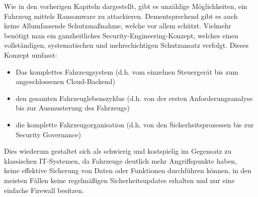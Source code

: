 Wie in den vorherigen Kapiteln dargestellt, gibt es unzählige Möglichkeiten, ein 
Fahrzeug mittels Ransomware zu attackieren. Dementsprechend gibt es auch keine 
Allumfassende Schutzmaßnahme, welche vor allem schützt. Vielmehr benötigt man ein 
ganzheitliches Security-Engineering-Konzept, welches einen vollständigen, systematischen 
und mehrschichtigen Schutzansatz verfolgt. 
Dieses Konzept umfasst:

\begin{itemize}
    \item Das komplettes Fahrzeugsystem (d.h. vom einzelnen Steuergerät bis 
    zum angeschlossenen Cloud-Backend)
    \item den gesamten Fahrzeuglebenszyklus (d.h. von der ersten Anforderungsanalyse 
    bis zur Ausmusterung des Fahrzeugs)
    \item die komplette Fahrzeugorganisation (d.h. von den Sicherheitsprozessen 
    bis zur Security Governance)
\end{itemize}

Dies wiederum gestaltet sich als schwierig und kostspielig im Gegensatz zu 
klassischen IT-Systemen, da Fahrzeuge deutlich mehr Angriffspunkte haben, 
keine effektive Sicherung von Daten oder Funktionen durchführen können, in den 
meisten Fällen keine regelmäßigen Sicherheitsupdates erhalten und nur eine einfache 
Firewall besitzen.

